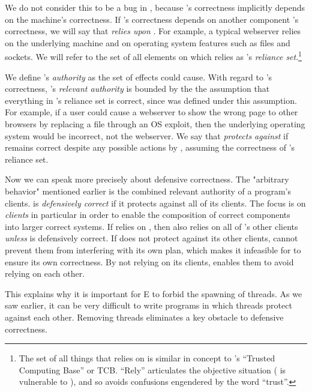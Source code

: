 \documentclass{llncs}
\begin{document}
We do not consider this to be a bug in , because 's
correctness implicitly depends on the machine's correctness.  If
's correctness depends on another component 's
correctness, we will say that  \emph{relies upon} .
For example, a typical webserver relies on the underlying machine and
on operating system features such as files and sockets.  We will refer
to the set of all elements on which  relies as 's
\emph{reliance set}.\footnote{
%
     The set of all things that  relies on is similar in
     concept to 's ``Trusted Computing Base'' or TCB. ``Rely''
     articulates the objective situation ( is vulnerable to
     ), and so avoids confusions engendered by the word
     ``trust''.}

We define 's \emph{authority} as the set of effects 
could cause.  With regard to 's correctness, 's
\emph{relevant authority} is bounded by the the assumption that
everything in 's reliance set is correct, since  was
defined under this assumption. For example, if a user could cause a
webserver to show the wrong page to other browsers by replacing a file
through an OS exploit, then the underlying operating system would be
incorrect, not the webserver. We say that  \emph{protects
against}  if  remains correct despite any possible
actions by , assuming the correctness of 's reliance
set.

Now we can speak more precisely about defensive correctness. The
"arbitrary behavior" mentioned earlier is the combined relevant
authority of a program's clients.  is \emph{defensively
correct} if it protects against all of its clients.  The focus is on
\emph{clients} in particular in order to enable the composition of
correct components into larger correct systems. If  relies on
, then  also relies on all of 's other clients
\emph{unless}  is defensively correct.  If  does not
protect against its other clients,  cannot prevent them from
interfering with its own plan, which makes it infeasible for 
to ensure its own correctness.  By not relying on its clients,
 enables them to avoid relying on each other.

This explains why it is important for E to forbid the spawning of
threads.  As we saw earlier, it can be very difficult to write
programs in which threads protect against each other.  Removing
threads eliminates a key obstacle to defensive correctness.
\end{document}
